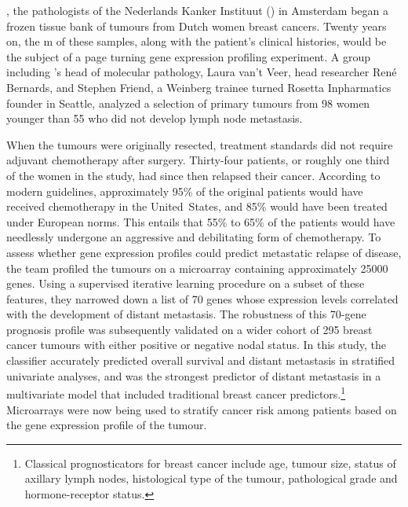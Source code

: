 
, the pathologists of the Nederlands Kanker
Instituut () in Amsterdam began a frozen tissue bank of tumours
from Dutch women breast cancers.  Twenty years on, the m of these
samples, along with the patient's clinical histories, would be the subject of a
page turning gene expression profiling experiment.  A group including
's head of molecular pathology, Laura van't Veer, head researcher
René Bernards, and Stephen Friend, a Weinberg trainee turned Rosetta
Inpharmatics founder in Seattle, analyzed a selection of primary tumours from 98
women younger than 55 who did not develop lymph node
metastasis.\cite{vant_veer_gene_2002}

When the tumours were originally resected, treatment standards did not require
adjuvant chemotherapy after surgery.  Thirty-four patients, or roughly one third
of the women in the study, had since then relapsed their cancer.  According to
modern guidelines, approximately 95\% of the original patients would have
received chemotherapy in the \mbox{United States}, and 85\% would have been
treated under European norms.  This entails that 55\% to 65\% of the patients
would have needlessly undergone an aggressive and debilitating form of
chemotherapy.  To assess whether gene expression profiles could predict
metastatic relapse of disease, the  team profiled the tumours on
a microarray containing approximately \num{25000} genes.  Using a supervised
iterative learning procedure on a subset of these features, they narrowed down a
list of 70 genes whose expression levels correlated with the development of
distant metastasis.  The robustness of this \mbox{70-gene} prognosis profile was
subsequently validated on a wider cohort of 295 breast cancer tumours with
either positive or negative nodal
status.\cite{van_de_vijver_gene-expression_2002} In this study, the classifier
accurately predicted overall survival and distant metastasis in stratified
univariate analyses, and was the strongest predictor of distant metastasis in a
multivariate model that included traditional breast cancer
predictors.\footnote{Classical prognosticators for breast cancer include age,
  tumour size, status of axillary lymph nodes, histological type of the tumour,
  pathological grade and \mbox{hormone-receptor} status.}  Microarrays were now
being used to stratify cancer risk among patients based on the gene expression
profile of the tumour.


